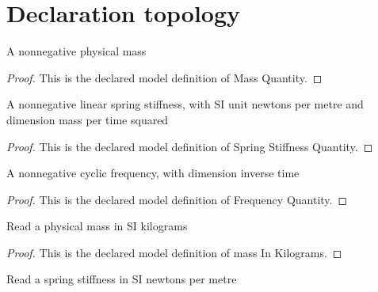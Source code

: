 \section{Declaration topology}
\begin{definition}
  \label{def:physics:phyx-mini-0252:phyxminiproblems-problemphyxmini0252-massquantity}
  A nonnegative physical mass
\end{definition}
\begin{proof}
  This is the declared model definition of Mass Quantity.
\end{proof}
\begin{definition}
  \label{def:physics:phyx-mini-0252:phyxminiproblems-problemphyxmini0252-springstiffnessquantity}
  A nonnegative linear spring stiffness, with SI unit newtons per metre and dimension mass per time squared
\end{definition}
\begin{proof}
  This is the declared model definition of Spring Stiffness Quantity.
\end{proof}
\begin{definition}
  \label{def:physics:phyx-mini-0252:phyxminiproblems-problemphyxmini0252-frequencyquantity}
  A nonnegative cyclic frequency, with dimension inverse time
\end{definition}
\begin{proof}
  This is the declared model definition of Frequency Quantity.
\end{proof}
\begin{definition}
  \label{def:physics:phyx-mini-0252:phyxminiproblems-problemphyxmini0252-massinkilograms}
  Read a physical mass in SI kilograms
\end{definition}
\begin{proof}
  This is the declared model definition of mass In Kilograms.
\end{proof}
\begin{definition}
  \label{def:physics:phyx-mini-0252:phyxminiproblems-problemphyxmini0252-stiffnessinnewtonspermeter}
  Read a spring stiffness in SI newtons per metre
\end{definition}
